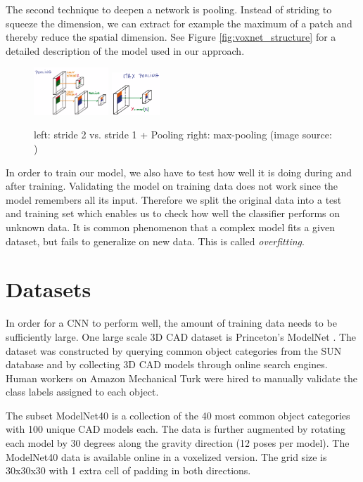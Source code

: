 \documentclass[10pt,twocolumn,letterpaper]{article}
\begin{document}
The second technique to deepen a network is pooling. Instead of striding to squeeze the dimension, 
we can extract for example the maximum of a patch and thereby reduce the spatial dimension. 
See Figure \ref{fig:voxnet_structure} for a detailed description of the model used in our approach.

\begin{figure}[h]
	\label{fig:pooling}
	\includegraphics[width=0.25\textwidth]{figures/con_max}
	\includegraphics[width=0.16\textwidth]{figures/max}
	\caption{left: stride 2 vs. stride 1 + Pooling \quad right: max-pooling (image source: \cite{udacity})}
\end{figure}

In order to train our model, we also have to test how well it is doing during and after training. 
Validating the model on training data does not work since the model remembers all its input. 
Therefore we split the original data into a test and training set which enables us to check how well the 
classifier performs on unknown data. It is common phenomenon that a complex model fits a given 
dataset, but fails to generalize on new data. This is called \textit{overfitting}.

\section{Datasets}
\label{data:modelnet}

In order for a CNN to perform well, the amount of training data needs to be sufficiently large. One large scale 3D CAD dataset is Princeton's 
ModelNet \cite{shape}. The dataset was constructed by querying common object categories from the SUN database \cite{sun} and 
by collecting 3D CAD models through online search engines. Human workers on Amazon Mechanical Turk were hired 
to manually validate the class labels assigned to each object.

The subset ModelNet40 is a collection of the 40 most common object categories with 100 unique CAD models each. The data is further augmented
by rotating each model by 30 degrees along the gravity direction (12 poses per model). 
The ModelNet40 data is available online in a voxelized version. The grid size is 30x30x30 with 1 extra cell of padding in both directions.
\end{document}
